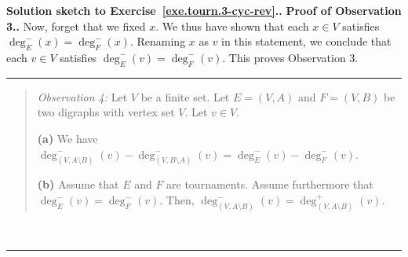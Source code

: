 \documentclass[numbers=enddot,12pt,final,onecolumn,notitlepage]{scrartcl}%
\theoremstyle{definition}
\newenvironment{statement}{\begin{quote}}{\end{quote}}
\newenvironment{proof}[1][Proof]{\noindent\textbf{#1.} }{\ \rule{0.5em}{0.5em}}
\newcommand{\tup}[1]{\left( #1 \right)}
\begin{document}
\begin{proof}[Solution sketch to Exercise~\ref{exe.tourn.3-cyc-rev}.]
\begin{proof}[Proof of Observation 3.]
Now, forget that we fixed $x$. We thus have shown that
each $x \in V$ satisfies $\deg^-_E \tup{x} = \deg^-_F \tup{x}$.
Renaming $x$ as $v$ in this statement, we conclude that
each $v \in V$ satisfies $\deg^-_E \tup{v} = \deg^-_F \tup{v}$.
This proves Observation 3.
\end{proof}

\begin{statement}
\textit{Observation 4:} Let $V$ be a finite set. Let
$E = \tup{V, A}$ and $F = \tup{V, B}$ be
two digraphs with vertex set $V$. Let $v \in V$.

\textbf{(a)} We have
$\deg^-_{\tup{V, A\setminus B}} \tup{v}
- \deg^-_{\tup{V, B\setminus A}} \tup{v}
= \deg^-_E \tup{v} - \deg^-_F \tup{v}$.

\textbf{(b)} Assume that $E$ and $F$ are tournaments.
Assume furthermore that
$\deg^-_E \tup{v} = \deg^-_F \tup{v}$. Then,
$\deg^-_{\tup{V, A\setminus B}} \tup{v}
= \deg^+_{\tup{V, A\setminus B}} \tup{v}$.
\end{statement}


\end{proof}
\end{document}
